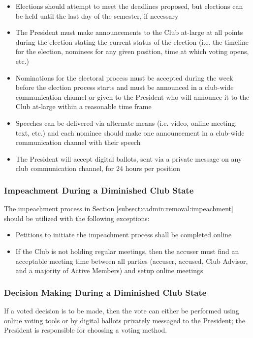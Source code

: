 \documentclass[english,11pt]{article}
\begin{document}
\begin{itemize}
    \item Elections should attempt to meet the deadlines proposed, but elections can be held until the last day of the semester, if necessary
    \item The President must make announcements to the Club at-large at all points during the election stating the current status of the election (i.e. the timeline for the election, nominees for any given position, time at which voting opens, etc.)
    \item Nominations for the electoral process must be accepted during the week before the election process starts and must be announced in a club-wide communication channel or given to the President who will announce it to the Club at-large within a reasonable time frame
    \item Speeches can be delivered via alternate means (i.e. video, online meeting, text, etc.) and each nominee should make one announcement in a club-wide communication channel with their speech 
    \item The President will accept digital ballots, sent via a private message on any club communication channel, for 24 hours per position
\end{itemize}

\subsubsection{Impeachment During a Diminished Club State} \label{subsect:reduced:impeachment}
The impeachment process in Section \ref{subsect:cadmin:removal:impeachment} should be utilized with the following exceptions:

\begin{itemize}
    \item Petitions to initiate the impeachment process shall be completed online
    \item If the Club is not holding regular meetings, then the accuser must find an acceptable meeting time between all parties (accuser, accused, Club Advisor, and a majority of Active Members) and setup online meetings
\end{itemize}

\subsubsection{Decision Making During a Diminished Club State} \label{subsect:reduced:decisions}
If a voted decision is to be made, then the vote can either be performed using online voting tools or by digital ballots privately messaged to the President; the President is responsible for choosing a voting method.
\end{document}
